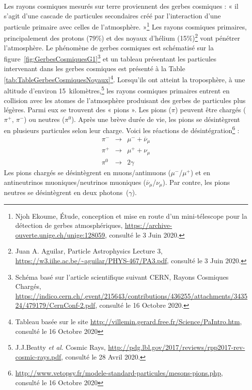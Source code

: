 \documentclass[a4paper, 12pt]{article}
\begin{document}
\begin{spacing}{1.5}
Les rayons cosmiques mesurés sur terre proviennent des gerbes cosmiques : « il s’agit d’une cascade de particules secondaires créé par l’interaction d’une particule primaire avec celles de l’atmosphère. »\footnote{Njoh Ekoume, Étude, conception et mise en route d’un mini-télescope pour la détection de gerbes atmosphériques, \url{https://archive-ouverte.unige.ch/unige:128059}, consulté le 3 Juin 2020.} Les rayons cosmiques primaires, principalement des protons (79\%) et des noyaux d’hélium (15\%)\footnote{Juan A. Aguilar, Particle Astrophysics Lecture 3, \url{https://w3.iihe.ac.be/~aguilar/PHYS-467/PA3.pdf}, consulté le 3 Juin 2020.} vont pénétrer l’atmosphère. Le phénomène de gerbes cosmiques est schématisé sur la figure~\ref{fig:GerbesCosmiquesG1}\footnote{Schéma basé sur l'article scientifique suivant CERN, Rayons Cosmiques Chargés, \url{https://indico.cern.ch/,event/215643/contributions/436255/attachments/343524/479179/CernConf-2.pdf}, consulté le 16 Octobre 2020.} et un tableau présentant les particules intervenant dans les gerbes cosmiques est présenté à la Table \ref{tab:TableGerbesCosmiquesNoyaux}\footnote{Tableau basée sur le site \url{http://villemin.gerard.free.fr/Science/PaIntro.htm}, consulté le 16 Octobre 2020}. Lorsqu’ils ont atteint la troposphère, à une altitude d’environ 15~kilomètres,\footnote{J.J.Beatty \emph{et al.} Cosmic Rays, \url{http://pdg.lbl.gov/2017/reviews/rpp2017-rev-cosmic-rays.pdf}, consulté le 28 Avril 2020.} les rayons cosmiques primaires entrent en collision avec les atomes de l’atmosphère produisant des gerbes de particules plus légères. Parmi eux se trouvent des « pions ». Les pions ($\pi$) peuvent être chargés ($\pi^+$, $\pi^-$) ou neutres ($\pi^0$). Après une brève durée de vie, les pions se désintègrent en plusieurs particules selon leur charge. Voici les réactions de désintégration\footnote{\url{http://www.vetopsy.fr/modele-standard-particules/mesons-pions.php}, consulté le 16 Octobre 2020} :
\begin{eqnarray}
\pi^- &\rightarrow& \mu^- + {\overline \nu}_\mu \label{eq:npid}\\
\pi^+ &\rightarrow& \mu^+ + \nu_\mu \label{eq:ppid}\\
\pi^0 &\rightarrow& 2\gamma \label{eq:0pid}
\end{eqnarray}
Les pions chargés se désintègrent en muons/antimuons ($\mu^-$/$\mu^+$) et en antineutrinos muoniques/neutrinos muoniques (${\overline \nu}_\mu$/$\nu_\mu$). Par contre, les pions neutres se désintègrent en deux photons~($\gamma$).


\end{spacing}
\end{document}
